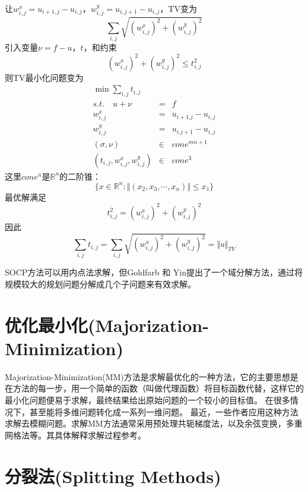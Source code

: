 \documentclass[a4paper,12pt]{article}
\begin{document}
让$w_{i,j}^x=u_{i+1,j}-u_{i,j}$，$w_{i,j}^y=u_{i,j+1}-u_{i,j}$，TV变为
\begin{displaymath}
\sum_{i,j}\sqrt{(w_{i,j}^x)^2+(w_{i,j}^y)^2}
\end{displaymath}
引入变量$\nu=f-u$，$t$，和约束
\begin{displaymath}
(w_{i,j}^x)^2+(w_{i,j}^y)^2\leq t _{i,j}^2
\end{displaymath}
则TV最小化问题变为
\begin{eqnarray*}
\min\sum_{i,j}t_{i,j}\\
s.t.\quad u+\nu&=&f\\
w_{i,j}^x&=&u_{i+1.j}-u_{i,j}\\
w_{i,j}^y&=&u_{i.j+1}-u_{i,j}\\
(\sigma,\nu)&\in &cone^{mn+1}\\
(t_{i,j},w_{i,j}^x,w_{i,j}^y)&\in& cone^3
\end{eqnarray*}
这里$cone^n$是$\mathbb{R}^n$的二阶锥：
\begin{displaymath}
\{x\in \mathbb{R}^n:\Vert (x_2,x_3,\cdots,x_n)\Vert\leq x_1\}
\end{displaymath}
最优解满足
\begin{displaymath}
t_{i,j}^2=(w_{i,j}^x)^2+(w_{i,j}^y)^2
\end{displaymath}
因此
\begin{displaymath}
\sum_{i,j}t_{i,j}=\sum_{i,j}\sqrt{(w_{i,j}^x)^2+(w_{i,j}^y)^2}=\Vert u\Vert_{TV}
\end{displaymath}

SOCP方法可以用内点法求解，但Goldfarb 和 Yin提出了一个域分解方法，通过将规模较大的规划问题分解成几个子问题来有效求解。

\section{优化最小化(Majorization-Minimization)}

Majorization-Minimization(MM)方法是求解最优化的一种方法，它的主要思想是在方法的每一步，用一个简单的函数（叫做代理函数）将目标函数代替，这样它的最小化问题便易于求解，最终结果给出原始问题的一个较小的目标值。
在很多情况下，甚至能将多维问题转化成一系列一维问题。
最近，一些作者\cite{Bioucas-Dias:2006mm}应用这种方法求解去模糊问题。求解MM方法通常采用预处理共轭梯度法，以及余弦变换，多重网格法等。其具体解释求解过程参考\cite{Bioucas-Dias:2006mm}。

\section{分裂法(Splitting Methods)}
\end{document}
